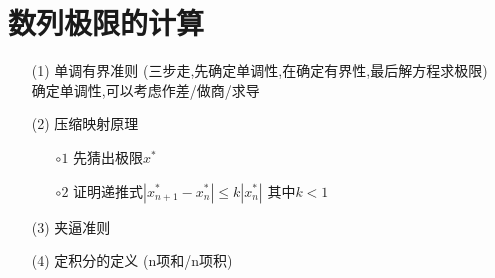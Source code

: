 \documentclass[12pt, a4paper, oneside, UTF8]{ctexbook}
\begin{document}
\section{数列极限的计算}
\begin{remark}[方法]
    \begin{enumerate}
        \item [(1)] 单调有界准则 (三步走,先确定单调性,在确定有界性,最后解方程求极限) \\
        确定单调性,可以考虑作差/做商/求导
        \item [(2)] 压缩映射原理
        \begin{enumerate}
            \item [$\circ 1$] 先猜出极限$x^*$
            \item [$\circ 2$] 证明递推式$\left|x^*_{n+1}-x^*_{n}\right|\leq k\left|x_{n}^*\right|$ 其中$k<1$
        \end{enumerate}
        \item [(3)] 夹逼准则
        \item [(4)] 定积分的定义 (n项和/n项积)
    \end{enumerate}
\end{remark}
\end{document}
